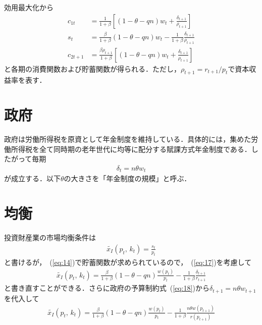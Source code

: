 \documentclass[12pt,a4paper]{jsarticle}
\begin{document}
効用最大化から
\begin{align}
	c_{1t} &=\frac{1}{1+\beta} \left[ (1-\theta-qn)w_{t} + \frac{\delta_{t+1}}{\rho_{t+1}} \right] \label{eq:13}\\
	s_{t} &= \frac{\beta}{1+\beta}(1-\theta-qn)w_{t}- \frac{1}{1+\beta}\frac{\delta_{t+1}}{\rho_{t+1}} \label{eq:14} \\
	c_{2t+1} &= \frac{\beta \rho_{t+1}}{1+\beta}\left[(1-\theta-qn)w_{t}+ \frac{\delta_{t+1}}{\rho_{t+1}} \right] \label{eq:15}
\end{align}
と各期の消費関数および貯蓄関数が得られる．ただし，$\rho_{t+1} = r_{t+1}/p_{t}$で資本収益率を表す．

\section{政府}
政府は労働所得税を原資として年金制度を維持している．具体的には，集めた労働所得税を全て同時期の老年世代に均等に配分する賦課方式年金制度である．したがって毎期
\begin{align}
 \delta_{t} = n \theta w_{t} \label{eq:18}
\end{align}
が成立する．以下$\theta$の大きさを「年金制度の規模」と呼ぶ．
\section{均衡}
%
%
%

投資財産業の市場均衡条件は
\begin{align}
 \tilde{x_{I}}(p_{t}, \, k_{t}) = \frac{s_{t}}{p_{t}}
\end{align}
と書けるが，~(\ref{eq:14})で貯蓄関数が求められているので，~(\ref{eq:17})を考慮して
\begin{align}
\tilde{x_{I}}(p_{t}, \, k_{t})=\frac{\beta}{1+\beta}(1-\theta-qn)\frac{w(p_{t})}{p_{t}} - \frac{1}{1+\beta}\frac{\delta_{t+1}}{r_{t+1}}
\end{align}
と書き直すことができる．さらに政府の予算制約式~(\ref{eq:18})から$\delta_{t+1} = n \theta w_{t+1}$を代入して
\begin{align}
 \tilde{x_{I}}(p_{t}, \, k_{t})  = \frac{\beta}{1+\beta}(1-\theta-qn)\frac{w(p_{t})}{p_{t}} - \frac{1}{1+\beta}\frac{ n \theta w(p_{t+1})}{r(p_{t+1})} \label{eq:5}
\end{align}
\end{document}
